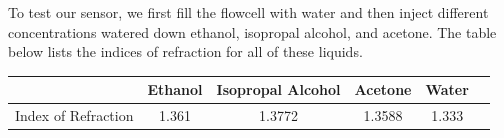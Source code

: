 \documentclass{article}
\begin{document}
To test our sensor, we first fill the flowcell with water and then inject different concentrations watered down ethanol, isopropal alcohol, and acetone. The table below lists the indices of refraction for all of these liquids.
\begin{center}
\begin{tabular}{| c | c c c c c |}
	\hline
    {}      			& Ethanol & Isopropal Alcohol & Acetone & Water \\
	\hline
	Index of Refraction & 1.361   & 1.3772            & 1.3588  & 1.333 \\
    \hline
\end{tabular}
\end{center}
\end{document}
